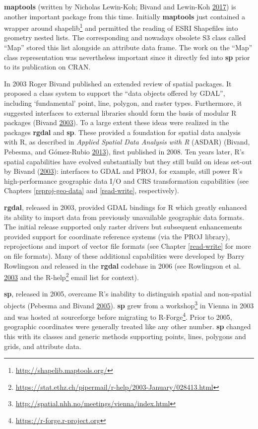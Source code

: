 \documentclass[]{krantz}
\let\rmarkdownfootnote\footnote%
\def\footnote{\protect\rmarkdownfootnote}
\renewcommand{\href}[2]{#2\footnote{\url{#1}}}
\begin{document}
\textbf{maptools} (written by Nicholas Lewin-Koh; Bivand and Lewin-Koh \protect\hyperlink{ref-bivand_maptools_2017}{2017}) is another important package from this time.
Initially \textbf{maptools} just contained a wrapper around \href{http://shapelib.maptools.org/}{shapelib} and permitted the reading of ESRI Shapefiles into geometry nested lists.
The corresponding and nowadays obsolete S3 class called ``Map'' stored this list alongside an attribute data frame.
The work on the ``Map'' class representation was nevertheless important since it directly fed into \textbf{sp} prior to its publication on CRAN.

In 2003 Roger Bivand published an extended review of spatial packages.
It proposed a class system to support the ``data objects offered by GDAL'', including `fundamental' point, line, polygon, and raster types.
Furthermore, it suggested interfaces to external libraries should form the basis of modular R packages (Bivand \protect\hyperlink{ref-hornik_approaches_2003}{2003}).
To a large extent these ideas were realized in the packages \textbf{rgdal} and \textbf{sp}.
These provided a foundation for spatial data analysis with R, as described in \emph{Applied Spatial Data Analysis with R} (ASDAR) (Bivand, Pebesma, and Gómez-Rubio \protect\hyperlink{ref-bivand_applied_2013}{2013}), first published in 2008.
Ten years later, R's spatial capabilities have evolved substantially but they still build on ideas set-out by Bivand (\protect\hyperlink{ref-hornik_approaches_2003}{2003}):
interfaces to GDAL and PROJ, for example, still power R's high-performance geographic data I/O and CRS transformation capabilities (see Chapters \ref{reproj-geo-data} and \ref{read-write}, respectively).

\textbf{rgdal}, released in 2003, provided GDAL bindings for R which greatly enhanced its ability to import data from previously unavailable geographic data formats.
The initial release supported only raster drivers but subsequent enhancements provided support for coordinate reference systems (via the PROJ library), reprojections and import of vector file formats (see Chapter \ref{read-write} for more on file formats).
Many of these additional capabilities were developed by Barry Rowlingson and released in the \textbf{rgdal} codebase in 2006 (see Rowlingson et al. \protect\hyperlink{ref-rowlingson_rasp:_2003}{2003} and the \href{https://stat.ethz.ch/pipermail/r-help/2003-January/028413.html}{R-help} email list for context).

\textbf{sp}, released in 2005, overcame R's inability to distinguish spatial and non-spatial objects (Pebesma and Bivand \protect\hyperlink{ref-pebesma_classes_2005}{2005}).
\textbf{sp} grew from a \href{http://spatial.nhh.no/meetings/vienna/index.html}{workshop} in Vienna in 2003 and was hosted at sourceforge before migrating to \href{https://r-forge.r-project.org}{R-Forge}.
Prior to 2005, geographic coordinates were generally treated like any other number.
\textbf{sp} changed this with its classes and generic methods supporting points, lines, polygons and grids, and attribute data.
\end{document}
